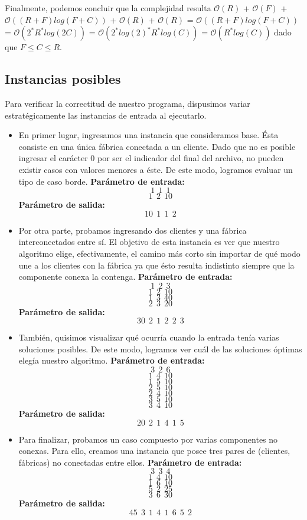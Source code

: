  Finalmente, podemos concluir que la complejidad resulta $\mathcal{O}(R)$ + $\mathcal{O}(F)$ + $\mathcal{O}((R+F)log(F+C))$ + $\mathcal{O}(R)$ + $\mathcal{O}(R)$ =  $\mathcal{O}((R+F)log(F+C))$ = $\mathcal{O}(2^*R^*log(2C))$ = $\mathcal{O}(2^*log(2)^*R^*log(C))$ = $\mathcal{O}(R^*log(C))$ dado que $F \leq C \leq R$.


\subsection{Instancias posibles}
Para verificar la correctitud de nuestro programa, dispusimos variar estratégicamente las instancias de entrada al ejecutarlo.
\begin{itemize}

\item En primer lugar, ingresamos una instancia que consideramos base. Ésta consiste en una única fábrica conectada a un cliente. Dado que no es posible ingresar el carácter 0 por ser el indicador del final del archivo, no pueden existir casos con valores menores a éste.
De este modo, logramos evaluar un tipo de caso borde.\newline
\textbf{Parámetro de entrada:} $$1\ \ 1\ \ 1$$
$$1\ \ 2\ \ 10$$
\textbf{Parámetro de salida:} $$10\ \ 1\ \ 1\ \ 2$$


\item Por otra parte, probamos ingresando dos clientes y una fábrica interconectados entre sí. El objetivo de esta instancia es ver que nuestro algoritmo elige, efectivamente, el camino más corto sin importar de qué modo une a los clientes con la fábrica ya que ésto resulta indistinto siempre que la componente conexa la contenga. \newline
\textbf{Parámetro de entrada:} $$1\ \  2\ \  3$$
$$1\ \  2\ \  10$$
$$1\ \  3\ \  40$$
$$2\ \  3\ \  20$$																											
\textbf{Parámetro de salida:} $$30\ \ 2\ \ 1\ \ 2\ \ 2\ \ 3$$


\item También, quisimos visualizar qué ocurría cuando la entrada tenía varias soluciones posibles. De este modo, logramos ver cuál de las soluciones óptimas elegía nuestro algoritmo.\newline
\textbf{Parámetro de entrada:} $$3\ \  2\ \  6$$
$$1\ \  4\ \  10$$
$$1\ \  5\ \  10$$
$$2\ \ 5\ \  10$$
$$2\ \ 4\ \  10$$
$$3\ \  5\ \  10$$
$$3\ \  4\ \  10$$
\textbf{Parámetro de salida:} $$20\ \ 2\ \ 1\ \ 4\ \ 1\ \ 5$$

\item Para finalizar, probamos un caso compuesto por varias componentes no conexas. Para ello, creamos una instancia que posee tres pares de (clientes, fábricas) no conectadas entre ellos. \newline
\textbf{Parámetro de entrada:} $$3\ \  3\ \  4$$
$$1\ \  4\ \  10$$
$$1\ \  6\ \  10$$
$$5\ \  2\ \  25$$
$$3\ \  6\ \  30$$																									
\textbf{Parámetro de salida:} $$45\ \ 3\ \ 1\ \ 4\ \ 1\ \ 6\ \ 5\ \ 2$$

\end{itemize}


